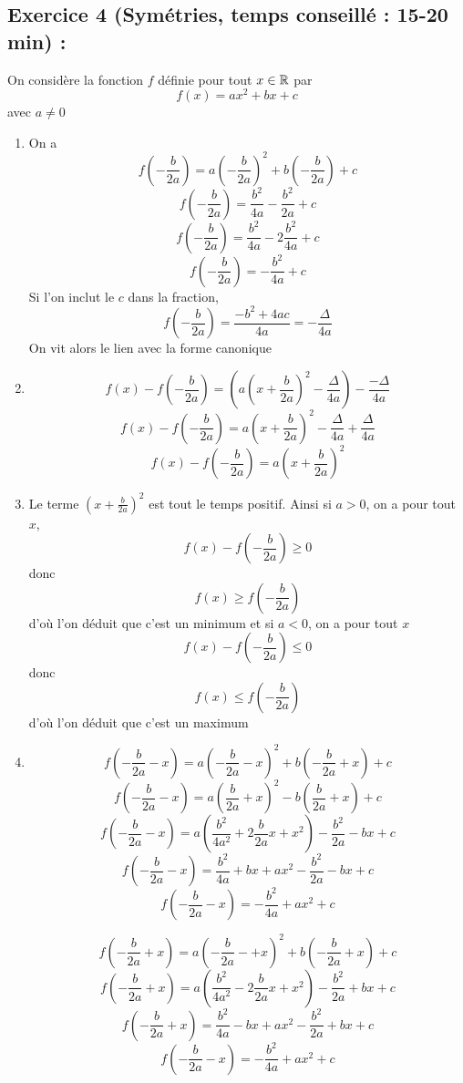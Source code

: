 \subsection*{Exercice 4 (Symétries, temps conseillé : 15-20 min) : }
On considère la fonction $f$ définie pour tout $x\in \mathbb{R}$ par 
$$f(x) = ax^2+bx+c$$
avec $a\neq 0$
\begin{enumerate}
\item On a $$ f\left(-\frac{b}{2a}\right) = a\left(-\frac{b}{2a}\right)^2 + b\left(-\frac{b}{2a}\right) + c$$
$$f\left(-\frac{b}{2a}\right) = \frac{b^2}{4a} - \frac{b^2}{2a} + c$$
$$f\left(-\frac{b}{2a}\right) = \frac{b^2}{4a} - 2\frac{b^2}{4a} + c$$
$$\boxed{f\left(-\frac{b}{2a}\right) = - \frac{b^2}{4a} + c}$$
Si l'on inclut le $c$ dans la fraction, 
$$\boxed{f\left(-\frac{b}{2a}\right) = \frac{-b^2 + 4ac}{4a} = -\frac{\Delta}{4a}}$$
On vit alors le lien avec la forme canonique
\item $$f(x)- f\left(-\frac{b}{2a}\right) = \left(a\left(x+\frac{b}{2a}\right)^2 -\frac{\Delta}{4a}\right) - \frac{-\Delta}{4a}$$
$$f(x)- f\left(-\frac{b}{2a}\right) = a\left(x+\frac{b}{2a}\right)^2 -\frac{\Delta}{4a} + \frac{\Delta}{4a}$$
$$\boxed{f(x)- f\left(-\frac{b}{2a}\right) = a\left(x+\frac{b}{2a}\right)^2}$$
\item Le terme $\displaystyle \left(x+\frac{b}{2a}\right)^2$ est tout le temps positif. Ainsi si $a > 0$, on a pour tout $x$, 
$$f(x)- f\left(-\frac{b}{2a}\right) \geq 0$$ donc $$\boxed{f(x) \geq f\left(-\frac{b}{2a}\right)}$$ d'où l'on déduit que c'est un minimum et si $a<0$, on a pour tout $x$ $$f(x)- f\left(-\frac{b}{2a}\right) \leq 0$$ donc $$\boxed{f(x) \leq f\left(-\frac{b}{2a}\right)}$$ d'où l'on déduit que c'est un maximum
\item 
$$f\left(-\frac{b}{2a} - x\right) = a\left(-\frac{b}{2a} - x\right)^2 + b\left(-\frac{b}{2a} +x\right) + c$$
$$f\left(-\frac{b}{2a} - x\right) = a\left(\frac{b}{2a} + x\right)^2 - b\left(\frac{b}{2a} +x\right) +c$$
$$f\left(-\frac{b}{2a} - x\right) = a\left(\frac{b^2}{4a^2} + 2\frac{b}{2a}x + x^2\right) - \frac{b^2}{2a} - bx +c$$
$$f\left(-\frac{b}{2a} - x\right) = \frac{b^2}{4a} + bx + ax^2 - \frac{b^2}{2a} -bx +c$$
$$\boxed{f\left(-\frac{b}{2a} - x\right) = -\frac{b^2}{4a} + ax^2 +c}$$

$$f\left(-\frac{b}{2a} + x\right) = a\left(-\frac{b}{2a} -+x\right)^2 + b\left(-\frac{b}{2a} +x\right) + c$$
$$f\left(-\frac{b}{2a} + x\right) = a\left(\frac{b^2}{4a^2} - 2\frac{b}{2a}x + x^2\right) - \frac{b^2}{2a} + bx +c$$
$$f\left(-\frac{b}{2a} + x\right) = \frac{b^2}{4a} - bx + ax^2 - \frac{b^2}{2a} +bx +c$$
$$\boxed{f\left(-\frac{b}{2a} - x\right) = -\frac{b^2}{4a} + ax^2 +c}$$


\end{enumerate}
